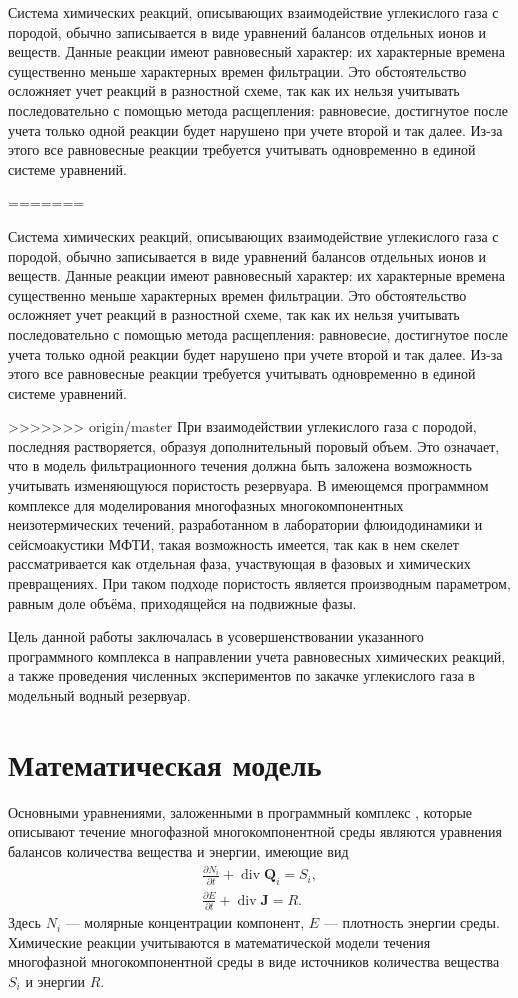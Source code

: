 \documentclass[14pt,a4paper]{extarticle}
\newcommand{\pd}[2]{\frac{\partial #1}{\partial #2}}
\renewcommand{\div}{\operatorname{div}}
\renewcommand{\vec}[1]{\boldsymbol{\mathbf{#1}}}
\begin{document}
Система химических реакций, описывающих взаимодействие углекислого газа с породой, обычно записывается в виде уравнений балансов отдельных ионов и веществ. Данные реакции имеют равновесный характер: их характерные времена  существенно меньше характерных времен фильтрации. Это обстоятельство осложняет учет реакций в разностной схеме, так как их нельзя учитывать последовательно с помощью метода расщепления: равновесие, достигнутое после учета только одной реакции будет нарушено при учете второй и так далее. Из-за этого все равновесные реакции требуется учитывать одновременно в единой системе уравнений.

=======

Система химических реакций, описывающих взаимодействие углекислого газа с породой, обычно записывается в виде уравнений балансов отдельных ионов и веществ. Данные реакции имеют равновесный характер: их характерные времена  существенно меньше характерных времен фильтрации. Это обстоятельство осложняет учет реакций в разностной схеме, так как их нельзя учитывать последовательно с помощью метода расщепления: равновесие, достигнутое после учета только одной реакции будет нарушено при учете второй и так далее. Из-за этого все равновесные реакции требуется учитывать одновременно в единой системе уравнений.

>>>>>>> origin/master
При взаимодействии углекислого газа с породой, последняя растворяется, образуя дополнительный поровый объем. Это означает, что в модель фильтрационного течения должна быть заложена возможность учитывать изменяющуюся пористость резервуара. В имеющемся программном комплексе для моделирования многофазных многокомпонентных неизотермических течений, разработанном в лаборатории флюидодинамики и сейсмоакустики МФТИ, такая возможность имеется, так как в нем скелет рассматривается как отдельная фаза, участвующая в фазовых и химических превращениях. При таком подходе пористость является производным параметром, равным доле объёма, приходящейся на подвижные фазы.

Цель данной работы заключалась в усовершенствовании указанного программного комплекса в направлении учета
равновесных химических реакций, а также проведения численных экспериментов по закачке углекислого газа в модельный водный резервуар.

\clearpage
\section{Математическая модель}

Основными уравнениями, заложенными в программный комплекс \cite{shev}, которые описывают течение многофазной многокомпонентной среды являются уравнения балансов количества вещества и энергии, имеющие вид
\begin{gather*}
\pd{N_i}{t} + \div \vec Q_i = S_i,\\
\pd{E}{t} + \div \vec J = R.
\end{gather*}
Здесь $N_i$ --- молярные концентрации компонент, $E$ --- плотность энергии среды. Химические реакции учитываются в математической модели течения многофазной многокомпонентной среды в виде источников количества вещества $S_i$ и энергии $R$.
\end{document}
